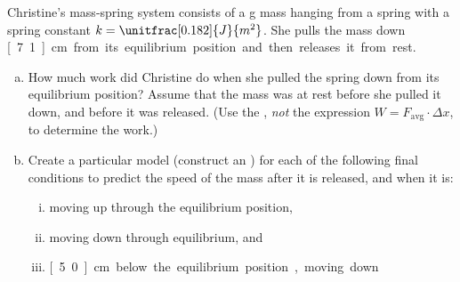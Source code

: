 \label{fnt2.2.1-6}

Christine's mass-spring system consists of a \unit[250]{g} mass hanging from a spring with a spring constant $k = \unitfrac[0.182]{J}{m^2}$. She pulls the mass down \unit[7.1]{cm} from its equilibrium position and then releases it from rest.

\begin{enumerate}[(a)]
	\item How much work did Christine do when she pulled the spring down from its equilibrium position? Assume that the mass was at rest before she pulled it down, and before it was released. (Use the \EnergyInteractionModel{}, {\em not} the expression $W = F_\text{avg} \cdot \Delta x$, to determine the work.)
	\label{fnt2.2.1-6a}
	\item Create a particular model (construct an \EnergyDiagram{}) for each of the following final conditions to predict the speed of the mass after it is released, and when it is:
	\label{fnt2.2.1-6b}
	\begin{enumerate}[(i)]
		\item moving up through the equilibrium position,
		\label{fnt2.2.1-6b1}
		\item moving down through equilibrium, and
		\label{fnt2.2.1-6b2}
		\item \unit[5.0]{cm} below the equilibrium position, moving down.
		\label{fnt2.2.1-6b3}
	\end{enumerate}
\end{enumerate}